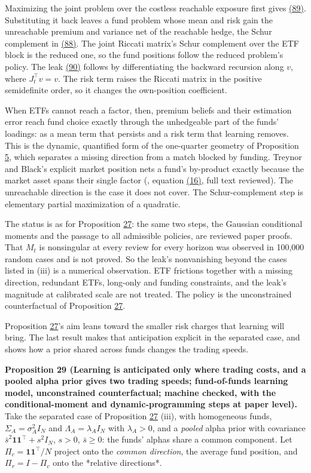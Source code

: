 \documentclass[11pt]{article}
\begin{document}
Maximizing the joint problem over the costless reachable exposure
first gives \hyperref[eq:89]{(89)}. Substituting it back leaves a fund problem whose
mean and risk gain the unreachable premium and variance net of the
reachable hedge, the Schur complement in \hyperref[eq:88]{(88)}. The joint Riccati
matrix's Schur complement over the ETF block is the reduced one, so
the fund positions follow the reduced problem's policy. The leak
\hyperref[eq:90]{(90)} follows by differentiating the backward recursion along \(v\),
where \(J_t^\top v=v\). The risk term raises the Riccati matrix in the
positive semidefinite order, so it changes the own-position
coefficient.

When ETFs cannot reach a factor, then, premium beliefs and their
estimation error reach fund choice exactly through the unhedgeable
part of the funds' loadings: as a mean term that persists and a risk
term that learning removes. This is the dynamic, quantified form of
the one-quarter geometry of Proposition \hyperref[res:Proposition-5]{5}, which separates a missing
direction from a match blocked by funding. Treynor and Black's
explicit market position nets a fund's by-product exactly because
the market asset spans their single factor (\cite{treynor1973security},
equation \hyperref[eq:16]{(16)}, full text reviewed). The unreachable direction is the
case it does not cover. The Schur-complement step is elementary
partial maximization of a quadratic.

The status is as for Proposition \hyperref[res:Proposition-27]{27}: the same two steps, the
Gaussian conditional moments and the passage to all admissible
policies, are reviewed paper proofs. That \(M_t\) is nonsingular at
every review for every horizon was observed in 100,000 random cases
and is not proved. So the leak's nonvanishing beyond the cases listed
in (iii) is a numerical observation. ETF frictions together with a
missing direction, redundant ETFs, long-only and funding constraints,
and the leak's magnitude at calibrated scale are not treated. The
policy is the unconstrained counterfactual of Proposition \hyperref[res:Proposition-27]{27}.

Proposition \hyperref[res:Proposition-27]{27}'s aim leans toward the smaller risk charges that
learning will bring. The last result makes that anticipation explicit
in the separated case, and shows how a prior shared across funds
changes the trading speeds.

\label{res:Proposition-29}
\textbf{Proposition 29 (Learning is anticipated only where trading costs, and a pooled alpha prior gives two trading speeds; fund-of-funds learning model, unconstrained counterfactual; machine checked, with the conditional-moment and dynamic-programming steps at paper level).}
Take the separated case of Proposition \hyperref[res:Proposition-27]{27} (iii), with homogeneous
funds, \(\Sigma_A=\sigma_A^2I_N\) and \(\Lambda_A=\lambda_AI_N\) with \(\lambda_A>0\), and a
\emph{pooled} alpha prior with covariance \(\bar s^2\mathbf 1\mathbf 1^\top+s^2I_N\),
\(s>0\), \(\bar s\geq0\): the funds' alphas share a common component. Let
\(\Pi_c=\mathbf 1\mathbf 1^\top/N\) project onto the \emph{common direction}, the
average fund position, and \(\Pi_r=I-\Pi_c\) onto the *relative
directions*.
\end{document}
